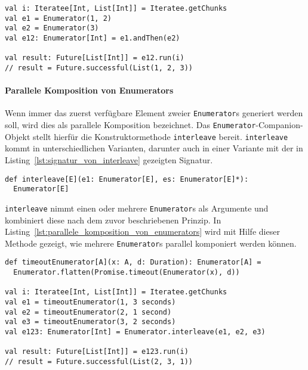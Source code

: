 \documentclass[draft=false
              ,paper=a4
              ,twoside=false
              ,fontsize=11pt
              ,headsepline
              ,BCOR10mm
              ,DIV11
              ]{scrbook}
\begin{document}
\begin{lstlisting}[caption=Sequentielle Komposition von Enumerators, label=lst:sequentielle_komposition_von_enumerators]
val i: Iteratee[Int, List[Int]] = Iteratee.getChunks
val e1 = Enumerator(1, 2)
val e2 = Enumerator(3)
val e12: Enumerator[Int] = e1.andThen(e2)

val result: Future[List[Int]] = e12.run(i)
// result = Future.successful(List(1, 2, 3))
\end{lstlisting}


\paragraph{Parallele Komposition von Enumerators} %
\label{subp:anwendung_parallele_komposition_von_enumerators}\mbox{} %

Wenn immer das zuerst verfügbare Element zweier \lstinline|Enumerator|s generiert werden soll, wird dies als parallele Komposition bezeichnet.
Das \lstinline|Enumerator|-Companion-Objekt stellt hierfür die Konstruktormethode \lstinline|interleave| bereit.
\lstinline|interleave| kommt in unterschiedlichen Varianten, darunter auch in einer Variante mit der in Listing~\ref{lst:signatur_von_interleave} gezeigten Signatur.

\begin{lstlisting}[caption=Die Signatur von interleave, label=lst:signatur_von_interleave]
def interleave[E](e1: Enumerator[E], es: Enumerator[E]*):
  Enumerator[E]
\end{lstlisting}

\lstinline|interleave| nimmt einen oder mehrere \lstinline|Enumerator|s als Argumente und kombiniert diese nach dem zuvor beschriebenen Prinzip.
In Listing~\ref{lst:parallele_komposition_von_enumerators} wird mit Hilfe dieser Methode gezeigt, wie mehrere \lstinline|Enumerator|s parallel komponiert werden können.

\begin{lstlisting}[caption=Parallele Komposition von Enumerators, label=lst:parallele_komposition_von_enumerators]
def timeoutEnumerator[A](x: A, d: Duration): Enumerator[A] =
  Enumerator.flatten(Promise.timeout(Enumerator(x), d))

val i: Iteratee[Int, List[Int]] = Iteratee.getChunks
val e1 = timeoutEnumerator(1, 3 seconds)
val e2 = timeoutEnumerator(2, 1 second)
val e3 = timeoutEnumerator(3, 2 seconds)
val e123: Enumerator[Int] = Enumerator.interleave(e1, e2, e3)

val result: Future[List[Int]] = e123.run(i)
// result = Future.successful(List(2, 3, 1))
\end{lstlisting}
\end{document}

